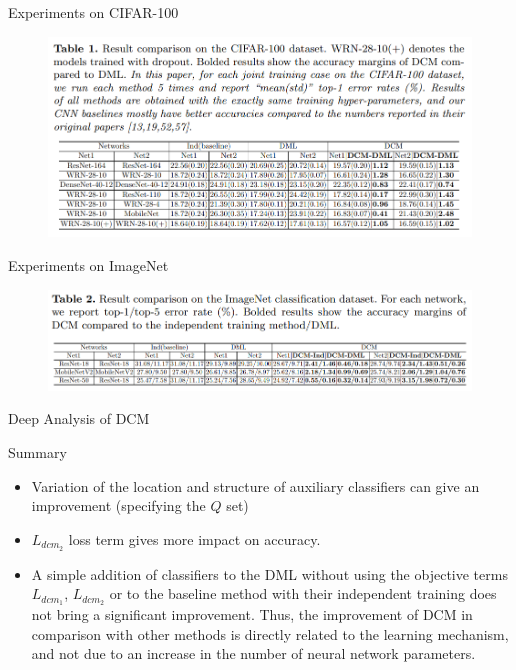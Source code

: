 \documentclass{beamer}
\begin{document}
\begin{frame}{Experiments on CIFAR-100}
    \begin{figure}
        \centering
        \includegraphics[scale=0.35]{CIFAR100_res.png}
        \label{fig:CIFAR_100_res}
    \end{figure}
\end{frame}

\begin{frame}{Experiments on ImageNet}
    \begin{figure}
        \centering
        \includegraphics[scale=0.35]{ImageNet_res.png}
        \label{fig:ImageNet_res}
    \end{figure}
\end{frame}

\begin{frame}{Deep Analysis of DCM}
    \begin{block}{Summary}
        \begin{itemize}
            \item Variation of the location and structure of auxiliary classifiers can give an improvement (specifying the $Q$ set)
            \item $L_{dcm_2}$ loss term gives more impact on accuracy. 
            \item A simple addition of classifiers to the DML without using the objective terms $L_{dcm_1}$, $L_{dcm_2}$ or to the baseline method with their independent training does not bring a significant improvement. Thus, the improvement of DCM in comparison with other methods is directly related to the learning mechanism, and not due to an increase in the number of neural network parameters. 
        \end{itemize}
    \end{block}
\end{frame}
\end{document}
